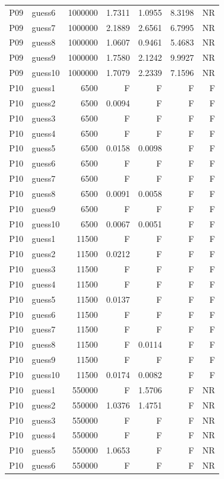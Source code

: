 {\begin{longtable}{llrrrrr}
P09 & guess6 & 1000000 & 1.7311 & 1.0955 & 8.3198 & NR \\
P09 & guess7 & 1000000 & 2.1889 & 2.6561 & 6.7995 & NR \\
P09 & guess8 & 1000000 & 1.0607 & 0.9461 & 5.4683 & NR \\
P09 & guess9 & 1000000 & 1.7580 & 2.1242 & 9.9927 & NR \\
P09 & guess10 & 1000000 & 1.7079 & 2.2339 & 7.1596 & NR \\
P10 & guess1 & 6500 & F & F & F & F \\
P10 & guess2 & 6500 & 0.0094 & F & F & F \\
P10 & guess3 & 6500 & F & F & F & F \\
P10 & guess4 & 6500 & F & F & F & F \\
P10 & guess5 & 6500 & 0.0158 & 0.0098 & F & F \\
P10 & guess6 & 6500 & F & F & F & F \\
P10 & guess7 & 6500 & F & F & F & F \\
P10 & guess8 & 6500 & 0.0091 & 0.0058 & F & F \\
P10 & guess9 & 6500 & F & F & F & F \\
P10 & guess10 & 6500 & 0.0067 & 0.0051 & F & F \\
P10 & guess1 & 11500 & F & F & F & F \\
P10 & guess2 & 11500 & 0.0212 & F & F & F \\
P10 & guess3 & 11500 & F & F & F & F \\
P10 & guess4 & 11500 & F & F & F & F \\
P10 & guess5 & 11500 & 0.0137 & F & F & F \\
P10 & guess6 & 11500 & F & F & F & F \\
P10 & guess7 & 11500 & F & F & F & F \\
P10 & guess8 & 11500 & F & 0.0114 & F & F \\
P10 & guess9 & 11500 & F & F & F & F \\
P10 & guess10 & 11500 & 0.0174 & 0.0082 & F & F \\
P10 & guess1 & 550000 & F & 1.5706 & F & NR \\
P10 & guess2 & 550000 & 1.0376 & 1.4751 & F & NR \\
P10 & guess3 & 550000 & F & F & F & NR \\
P10 & guess4 & 550000 & F & F & F & NR \\
P10 & guess5 & 550000 & 1.0653 & F & F & NR \\
P10 & guess6 & 550000 & F & F & F & NR \\

\end{longtable}}
